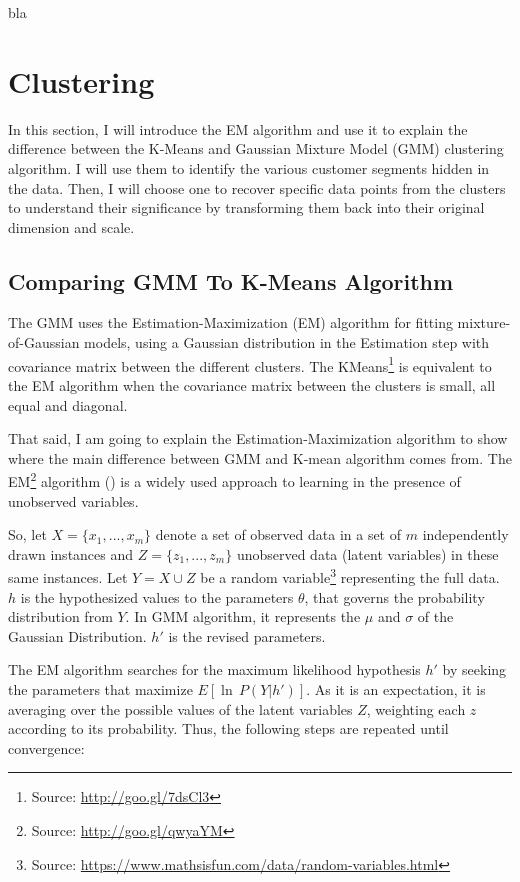 \documentclass[a4paper]{article}
\begin{document}
bla


\section{Clustering}
\label{sec:clustering}
In this section, I will introduce the EM algorithm and use it to explain the difference between the K-Means and Gaussian Mixture Model (GMM) clustering algorithm. I will use them to identify the various customer segments hidden in the data. Then, I will choose one to recover specific data points from the clusters to understand their significance by transforming them back into their original dimension and scale. 

\subsection{Comparing GMM To K-Means Algorithm}

The GMM uses the Estimation-Maximization (EM) algorithm for fitting mixture-of-Gaussian models, using a Gaussian distribution in the Estimation step with covariance matrix between the different clusters. The KMeans\footnote{Source: \url{http://goo.gl/7dsCl3}} is equivalent to the EM algorithm when the covariance matrix between the clusters is small, all equal and diagonal.

That said, I am going to explain the Estimation-Maximization algorithm to show where the main difference between GMM and K-mean algorithm comes from. The EM\footnote{Source: \url{http://goo.gl/qwyaYM}} algorithm (\cite{Mitchell}) is a widely used approach to learning in the presence of unobserved variables.

So, let $X = \{x_1, ..., x_m\}$ denote a set of observed data in a set of $m$ independently drawn instances and $Z = \{z_1, ..., z_m\}$ unobserved data (latent variables) in these same instances. Let $Y = X \cup Z$ be a random variable\footnote{Source: \url{https://www.mathsisfun.com/data/random-variables.html}} representing the full data. $h$ is the hypothesized values to the parameters $\theta$, that governs the probability distribution from $Y$. In GMM algorithm, it represents the $\mu$ and $\sigma$ of the Gaussian Distribution. ${h}'$ is the revised parameters.

The EM algorithm searches for the maximum likelihood hypothesis ${h}'$ by seeking the parameters that maximize $E[\ln \, P(Y |{h}')]$. As it is an expectation, it is averaging over the possible values of the latent variables $Z$, weighting each $z$ according to its probability. Thus, the following steps are repeated until convergence:
\end{document}
